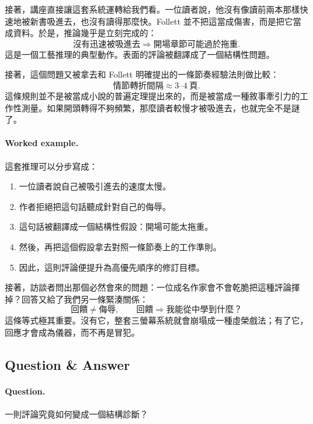 接著，講座直接讓這套系統運轉給我們看。一位讀者說，他沒有像讀前兩本那樣快速地被新書吸進去，也沒有讀得那麼快。Follett 並不把這當成傷害，而是把它當成資料。於是，推論幾乎是立刻完成的：
\begin{equation}
\text{沒有迅速被吸進去} \Rightarrow \text{開場章節可能過於拖重}.
\end{equation}
這是一個工藝推理的典型動作。表面的評論被翻譯成了一個結構性問題。

接著，這個問題又被拿去和 Follett 明確提出的一條節奏經驗法則做比較：
\begin{equation}
\text{情節轉折間隔} \approx 3\text{--}4 \ \text{頁}.
\end{equation}
這條規則並不是被當成小說的普遍定理提出來的，而是被當成一種敘事牽引力的工作性測量。如果開頭轉得不夠頻繁，那麼讀者較慢才被吸進去，也就完全不是謎了。

\paragraph{Worked example.} 這套推理可以分步寫成：
\begin{enumerate}
\item 一位讀者說自己被吸引進去的速度太慢。
\item 作者拒絕把這句話聽成針對自己的侮辱。
\item 這句話被翻譯成一個結構性假設：開場可能太拖重。
\item 然後，再把這個假設拿去對照一條節奏上的工作準則。
\item 因此，這則評論便提升為高優先順序的修訂目標。
\end{enumerate}

接著，訪談者問出那個必然會來的問題：一位成名作家會不會乾脆把這種評論揮掉？回答又給了我們另一條緊湊關係：
\begin{equation}
\text{回饋} \neq \text{侮辱}, \qquad
\text{回饋} \Rightarrow \text{我能從中學到什麼？}
\end{equation}
這條等式極其重要。沒有它，整套三螢幕系統就會崩塌成一種虛榮戲法；有了它，回應才會成為儀器，而不再是冒犯。

\subsection{Question \& Answer}

\paragraph{Question.} 一則評論究竟如何變成一個結構診斷？

